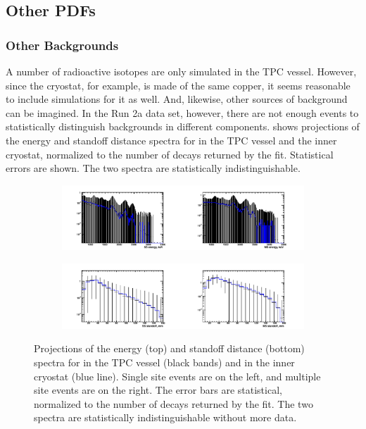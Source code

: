 \documentclass[herrin-thesis.tex]{subfiles}
\begin{document}
\subsection{Other PDFs}
\subsubsection{Other Backgrounds}
A number of radioactive isotopes are only simulated in the TPC vessel. However, since the cryostat, for example, is made of the same copper, it seems reasonable to include simulations for it as well. And, likewise, other sources of background can be imagined. In the Run 2a data set, however, there are not enough events to statistically distinguish backgrounds in different components.  shows projections of the energy and standoff distance spectra for  in the TPC vessel and the inner cryostat, normalized to the number of  decays returned by the fit. Statistical errors are shown. The two spectra are statistically indistinguishable.
 
\begin{figure}[tbp]
\centering
\begin{subfigure}[c]{\textwidth}
	\centering
	\includegraphics[trim = 1.25cm 0cm 1.25cm 0.5cm, clip=true, width=\textwidth]{./plots/analysis_degenerate_uranium_spectra_e.pdf}
\end{subfigure}
\begin{subfigure}[c]{\textwidth}
	\centering
	\includegraphics[trim = 1.25cm 0cm 1.25cm 0.5cm, clip=true, width=\textwidth]{./plots/analysis_degenerate_uranium_spectra_s.pdf}
\end{subfigure}
\caption[Lack of statistical power to distinguish the source of uranium backgrounds]{Projections of the energy (top) and standoff distance (bottom) spectra for  in the TPC vessel (black bands) and in the inner cryostat (blue line). Single site events are on the left, and multiple site events are on the right. The error bars are statistical, normalized to the number of  decays returned by the fit. The two spectra are statistically indistinguishable without more data.}
\label{fig:analysis_degenerate_uranium_spectra}
\end{figure}
\end{document}
